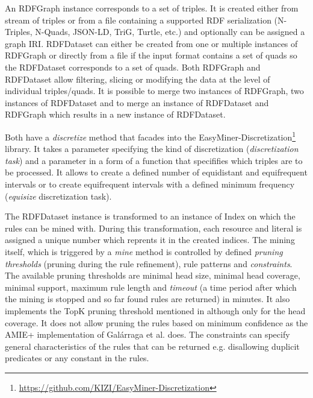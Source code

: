
An RDFGraph instance corresponds to a set of triples. It is created either from stream of triples or from a file containing a supported RDF serialization (N-Triples, N-Quads, JSON-LD, TriG, Turtle, etc.) and optionally can be assigned a graph IRI. RDFDataset can either be created from one or multiple instances of RDFGraph or directly from a file if the input format contains a set of quads so the RDFDataset corresponds to a set of quads. Both RDFGraph and RDFDataset allow filtering, slicing or modifying the data at the level of individual triples/quads. It is possible to merge two instances of RDFGraph, two instances of RDFDataset and to merge an instance of RDFDataset and RDFGraph which results in a new instance of RDFDataset.

Both have a \textit{discretize} method that facades into the EasyMiner-Discretization\footnote{\href{https://github.com/KIZI/EasyMiner-Discretization}{https://github.com/KIZI/EasyMiner-Discretization}} library. It takes a parameter specifying the kind of discretization (\textit{discretization task}) and a parameter in a form of a function that specififies which triples are to be processed. It allows to create a defined number of equidistant and equifrequent intervals or to create equifrequent intervals with a defined minimum frequency (\textit{equisize} discretization task).


The RDFDataset instance is transformed to an instance of Index on which the rules can be mined with. During this transformation, each resource and literal is assigned a unique number which reprents it in the created indices. The mining itself, which is triggered by a \textit{mine} method is controlled by defined \textit{pruning thresholds} (pruning during the rule refinement), rule patterns and \textit{constraints}. The available pruning thresholds are minimal head size, minimal head coverage, minimal support, maximum rule length and \textit{timeout} (a time period after which the mining is stopped and so far found rules are returned) in minutes. It also implements the TopK pruning threshold mentioned in \cite{Zeman2020} although only for the head coverage. It does not allow pruning the rules based on minimum confidence as the AMIE+ implementation of Galárraga et al. does. The constraints can specify general characteristics of the rules that can be returned e.g. disallowing duplicit predicates or any constant in the rules.

